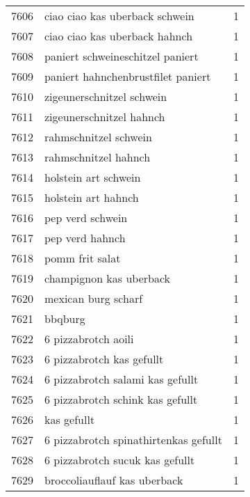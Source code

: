 \begin{tabular}{llr}
7606 &                     ciao ciao kas uberback schwein &      1 \\
7607 &                      ciao ciao kas uberback hahnch &      1 \\
7608 &                   paniert schweineschitzel paniert &      1 \\
7609 &                 paniert hahnchenbrustfilet paniert &      1 \\
7610 &                          zigeunerschnitzel schwein &      1 \\
7611 &                           zigeunerschnitzel hahnch &      1 \\
7612 &                              rahmschnitzel schwein &      1 \\
7613 &                               rahmschnitzel hahnch &      1 \\
7614 &                               holstein art schwein &      1 \\
7615 &                                holstein art hahnch &      1 \\
7616 &                                   pep verd schwein &      1 \\
7617 &                                    pep verd hahnch &      1 \\
7618 &                                    pomm frit salat &      1 \\
7619 &                            champignon kas uberback &      1 \\
7620 &                                mexican burg scharf &      1 \\
7621 &                                            bbqburg &      1 \\
7622 &                                6 pizzabrotch aoili &      1 \\
7623 &                          6 pizzabrotch kas gefullt &      1 \\
7624 &                   6 pizzabrotch salami kas gefullt &      1 \\
7625 &                   6 pizzabrotch schink kas gefullt &      1 \\
7626 &                                        kas gefullt &      1 \\
7627 &              6 pizzabrotch spinathirtenkas gefullt &      1 \\
7628 &                    6 pizzabrotch sucuk kas gefullt &      1 \\
7629 &                       broccoliauflauf kas uberback &      1 \\

\end{tabular}
